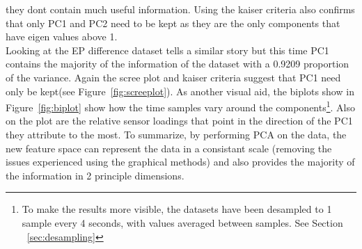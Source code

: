 \documentclass[twocolumn]{article}
\begin{document}
they dont contain much useful information. Using the kaiser criteria also confirms that only PC1 and PC2 need to be kept as they are
the only components that have eigen values above 1. \\
Looking at the EP difference dataset tells a similar story but this time PC1 contains the majority of the information of the dataset with
a 0.9209 proportion of the variance. Again the scree plot and kaiser criteria suggest that PC1 need only be kept(see Figure~\ref{fig:screeplot}). 
As another visual aid, the biplots show in Figure~\ref{fig:biplot} show how the time samples vary around the components\footnote{To make the results
more visible, the datasets have been desampled to 1 sample every 4 seconds, with values averaged between samples. See Section ~\ref{sec:desampling}}. Also on the plot
are the relative sensor loadings that point in the direction of the PC1 they attribute to the most. To summarize, by performing PCA on the data, 
the new feature space can represent the data in a consistant scale (removing the issues experienced using the graphical methods) and also provides 
the majority of the information in 2 principle dimensions. 
\end{document}
